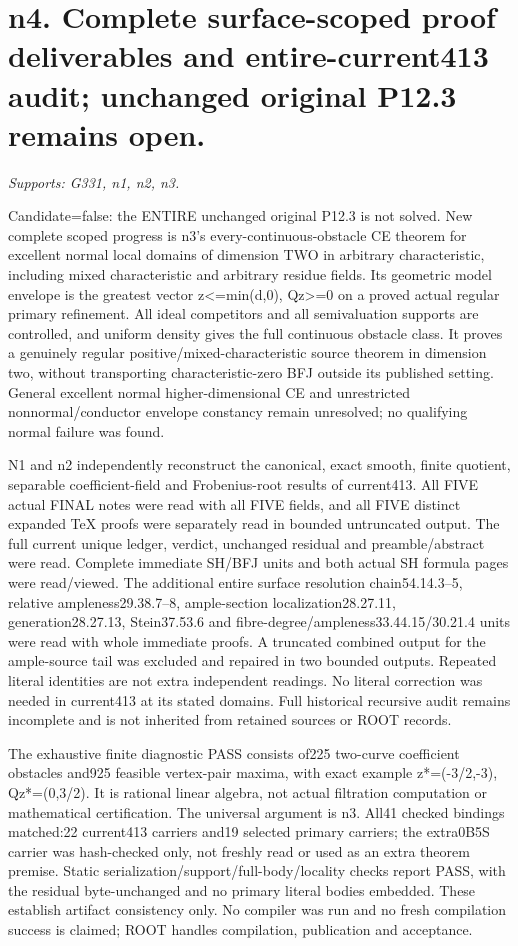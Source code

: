 \section{n4. Complete surface-scoped proof deliverables and entire-current413 audit; unchanged original P12.3 remains open.}
\textit{Supports: G331, n1, n2, n3.}

Candidate=false: the ENTIRE unchanged original P12.3 is not solved. New complete scoped progress is n3's every-continuous-obstacle CE theorem for excellent normal local domains of dimension TWO in arbitrary characteristic, including mixed characteristic and arbitrary residue fields. Its geometric model envelope is the greatest vector z<=min(d,0), Qz>=0 on a proved actual regular primary refinement. All ideal competitors and all semivaluation supports are controlled, and uniform density gives the full continuous obstacle class. It proves a genuinely regular positive/mixed-characteristic source theorem in dimension two, without transporting characteristic-zero BFJ outside its published setting. General excellent normal higher-dimensional CE and unrestricted nonnormal/conductor envelope constancy remain unresolved; no qualifying normal failure was found.

N1 and n2 independently reconstruct the canonical, exact smooth, finite quotient, separable coefficient-field and Frobenius-root results of current413. All FIVE actual FINAL notes were read with all FIVE fields, and all FIVE distinct expanded TeX proofs were separately read in bounded untruncated output. The full current unique ledger, verdict, unchanged residual and preamble/abstract were read. Complete immediate SH/BFJ units and both actual SH formula pages were read/viewed. The additional entire surface resolution chain54.14.3--5, relative ampleness29.38.7--8, ample-section localization28.27.11, generation28.27.13, Stein37.53.6 and fibre-degree/ampleness33.44.15/30.21.4 units were read with whole immediate proofs. A truncated combined output for the ample-source tail was excluded and repaired in two bounded outputs. Repeated literal identities are not extra independent readings. No literal correction was needed in current413 at its stated domains. Full historical recursive audit remains incomplete and is not inherited from retained sources or ROOT records.

The exhaustive finite diagnostic PASS consists of225 two-curve coefficient obstacles and925 feasible vertex-pair maxima, with exact example z*=(-3/2,-3), Qz*=(0,3/2). It is rational linear algebra, not actual filtration computation or mathematical certification. The universal argument is n3. All41 checked bindings matched:22 current413 carriers and19 selected primary carriers; the extra0B5S carrier was hash-checked only, not freshly read or used as an extra theorem premise. Static serialization/support/full-body/locality checks report PASS, with the residual byte-unchanged and no primary literal bodies embedded. These establish artifact consistency only. No compiler was run and no fresh compilation success is claimed; ROOT handles compilation, publication and acceptance.

